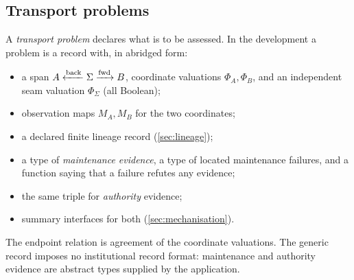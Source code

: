 \subsection{Transport problems}
A \emph{transport problem} declares what is to be assessed. In the development a problem is a record  with, in abridged form:
\begin{itemize}
\item a span $A \xleftarrow{\mathrm{back}} \Sigma \xrightarrow{\mathrm{fwd}} B$, coordinate valuations $\Phi_A, \Phi_B$, and an independent seam valuation $\Phi_\Sigma$ (all Boolean);
\item observation maps $M_A, M_B$ for the two coordinates;
\item a declared finite lineage record (\cref{sec:lineage});
\item a type of \emph{maintenance evidence}, a type of located maintenance failures, and a function saying that a failure refutes any evidence;
\item the same triple for \emph{authority} evidence;
\item summary interfaces for both (\cref{sec:mechanisation}).
\end{itemize}
The endpoint relation is agreement of the coordinate valuations. The generic record imposes no institutional record format: maintenance and authority evidence are abstract types supplied by the application.

